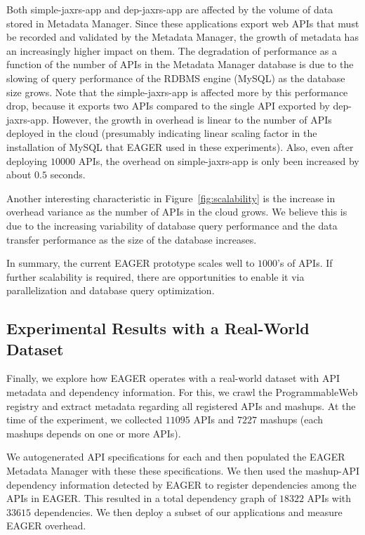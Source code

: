 Both simple-jaxrs-app and dep-jaxrs-app are
affected by the volume of data stored in Metadata Manager. Since these applications 
export web APIs that must be recorded and validated by the Metadata Manager, 
the growth of metadata has an increasingly higher impact on them. 
The degradation 
of performance as a function of the number of APIs in the Metadata Manager
database is due to the slowing of query performance of the RDBMS engine (MySQL) 
as the database size grows. Note that the simple-jaxrs-app
is affected more by this performance drop, because it exports two APIs compared to the single API exported 
by dep-jaxrs-app. However, the growth
in overhead is linear to the number of APIs deployed in the cloud (presumably
indicating linear scaling factor in the installation of MySQL that EAGER used
in these experiments). Also,
even after deploying $10000$ APIs, the overhead on simple-jaxrs-app is only been increased by 
about $0.5$ seconds.

Another interesting characteristic in Figure~\ref{fig:scalability} is the
increase in overhead variance as the number of APIs in the cloud
grows.  We believe this is due to the increasing variability of database query
performance and the data transfer performance as the size of the database
increases.

In summary, the current EAGER prototype scales well to $1000$'s of APIs.
If further scalability is required, there are opportunities to enable it
via parallelization and database query optimization.

\subsection{Experimental Results with a Real-World Dataset}

Finally, we explore how EAGER operates with a real-world dataset with API
metadata and dependency information. For this, we crawl the ProgrammableWeb
registry and extract metadata regarding all registered APIs and mashups.
At the time of the experiment, we collected $11095$ APIs and $7227$ 
mashups (each mashups depends on one or more APIs).

We autogenerated API specifications for each and then
populated the EAGER Metadata Manager with these these specifications.
We then used the
mashup-API dependency information detected by EAGER
to register dependencies among the APIs in 
EAGER. This resulted in a total dependency graph of $18322$ APIs 
with $33615$ dependencies.  We then deploy a subset of our applications
and measure EAGER overhead.

